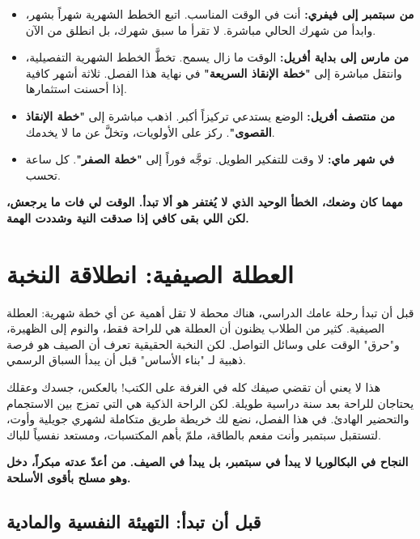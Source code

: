 \documentclass[12pt,a4paper]{book}
\newcommand{\importantAr}[1]{%
	\begin{important}
		\bfseries #1
	\end{important}
}
\begin{document}
	\begin{itemize}
		\item \textbf{من سبتمبر إلى فيفري:}
		أنت في الوقت المناسب. اتبع الخطط الشهرية شهراً بشهر،
		وابدأ من شهرك الحالي مباشرة. لا تقرأ ما سبق شهرك،
		بل انطلق من الآن.
		
		\item \textbf{من مارس إلى بداية أفريل:}
		الوقت ما زال يسمح. تخطَّ الخطط الشهرية التفصيلية،
		وانتقل مباشرة إلى \textbf{"خطة الإنقاذ السريعة"}
		في نهاية هذا الفصل. ثلاثة أشهر كافية إذا أحسنت استثمارها.
		
		\item \textbf{من منتصف أفريل:}
		الوضع يستدعي تركيزاً أكبر. اذهب مباشرة إلى
		\textbf{"خطة الإنقاذ القصوى"}.
		ركز على الأولويات، وتخلَّ عن ما لا يخدمك.
		
		\item \textbf{في شهر ماي:}
		لا وقت للتفكير الطويل. توجَّه فوراً إلى
		\textbf{"خطة الصفر"}.
		كل ساعة تحسب.
	\end{itemize}
	
	\importantAr{مهما كان وضعك، الخطأ الوحيد الذي لا يُغتفر هو ألا تبدأ.
		الوقت لي فات ما يرجعش، لكن اللي بقى كافي إذا صدقت النية وشددت الهمة.}
	
	\section{العطلة الصيفية: انطلاقة النخبة}
	
	قبل أن تبدأ رحلة عامك الدراسي، هناك محطة لا تقل أهمية عن أي خطة شهرية: العطلة الصيفية. كثير من الطلاب يظنون أن العطلة هي للراحة فقط، والنوم إلى الظهيرة، و"حرق" الوقت على وسائل التواصل. لكن النخبة الحقيقية تعرف أن الصيف هو فرصة ذهبية لـ "بناء الأساس" قبل أن يبدأ السباق الرسمي.
	
	هذا لا يعني أن تقضي صيفك كله في الغرفة على الكتب! بالعكس، جسدك وعقلك يحتاجان للراحة بعد سنة دراسية طويلة. لكن الراحة الذكية هي التي تمزج بين الاستجمام والتحضير الهادئ. في هذا الفصل، نضع لك خريطة طريق متكاملة لشهري جويلية وأوت، لتستقبل سبتمبر وأنت مفعم بالطاقة، ملمّ بأهم المكتسبات، ومستعد نفسياً للباك.
	
	\importantAr{النجاح في البكالوريا لا يبدأ في سبتمبر، بل يبدأ في الصيف. من أعدّ عدته مبكراً، دخل وهو مسلح بأقوى الأسلحة.}
	
	\subsection{قبل أن تبدأ: التهيئة النفسية والمادية}
	
\end{document}
